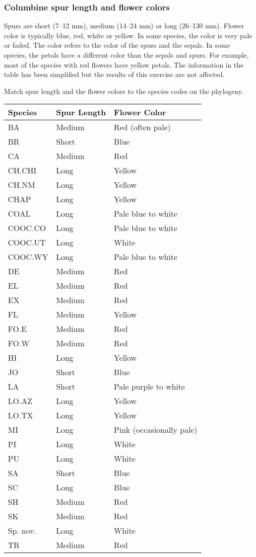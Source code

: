 \documentclass[12pt, hidelinks]{exam}
\begin{document}
\newpage

\subsubsection*{Columbine spur length and flower colors}

Spurs are short (7--12 mm), medium (14--24 mm) or long (26--130 mm).  
Flower color is typically blue, red, white or yellow. In some species,
the color is very pale or faded. The color refers to the color of the
spurs and the sepals. In some species, the petals have a different color
than the sepals and spurs. For example, most of the species with red
flowers have yellow petals. The information in the table has been simplified
but the results of this exercise are not affected.

Match spur length and the flower colors to the species codes on the phylogeny.

\begin{tabular}[c]{@{}lll@{}}
\toprule
Species & Spur Length & Flower Color\tabularnewline
\midrule
BA 				& Medium	& Red (often pale)\tabularnewline
BR 				& Short 	& Blue\tabularnewline
CA 				& Medium	& Red\tabularnewline
CH.CHI 		& Long 		& Yellow\tabularnewline
CH.NM 		& Long 		& Yellow\tabularnewline
CHAP 			& Long 		& Yellow\tabularnewline
COAL 			& Long 		& Pale blue to white\tabularnewline
COOC.CO	& Long 		& Pale blue to white\tabularnewline
COOC.UT 	& Long		& White\tabularnewline
COOC.WY 	& Long		& Pale blue to white\tabularnewline
DE 				& Medium	& Red\tabularnewline
EL 				& Medium	& Red\tabularnewline
EX 				& Medium	& Red\tabularnewline
FL 				& Medium	& Yellow\tabularnewline
FO.E 			& Medium	& Red\tabularnewline
FO.W 			& Medium	& Red\tabularnewline
HI 				& Long		& Yellow\tabularnewline
JO				& Short 	& Blue\tabularnewline
LA 				& Short 	& Pale purple to white\tabularnewline
LO.AZ 			& Long		& Yellow\tabularnewline
LO.TX 			& Long		& Yellow\tabularnewline
MI					& Long		& Pink (occasionally pale)\tabularnewline
PI 				& Long 		& White\tabularnewline
PU				& Long 		& White\tabularnewline
SA				& Short		& Blue\tabularnewline
SC 				& Long 		& Blue\tabularnewline
SH 				& Medium	& Red\tabularnewline
SK				& Medium	& Red\tabularnewline
Sp. nov.\footnotemark	& Long & White\tabularnewline
TR 				& Medium	& Red\tabularnewline
\bottomrule
\end{tabular}


\end{document}
